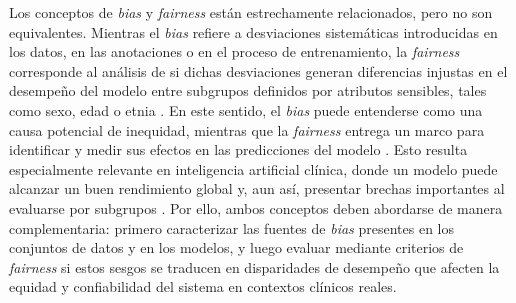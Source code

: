 Los conceptos de \textit{bias} y \textit{fairness} están estrechamente relacionados, pero no son equivalentes. Mientras el \textit{bias} refiere a desviaciones sistemáticas introducidas en los datos, en las anotaciones o en el proceso de entrenamiento, la \textit{fairness} corresponde al análisis de si dichas desviaciones generan diferencias injustas en el desempeño del modelo entre subgrupos definidos por atributos sensibles, tales como sexo, edad o etnia \parencite{williamson2023,sahiner2023}. En este sentido, el \textit{bias} puede entenderse como una causa potencial de inequidad, mientras que la \textit{fairness} entrega un marco para identificar y medir sus efectos en las predicciones del modelo \parencite{liu2023translational,gao2024}. Esto resulta especialmente relevante en inteligencia artificial clínica, donde un modelo puede alcanzar un buen rendimiento global y, aun así, presentar brechas importantes al evaluarse por subgrupos \parencite{NEURIPS2024_c9826b9e,williamson2023}. Por ello, ambos conceptos deben abordarse de manera complementaria: primero caracterizar las fuentes de \textit{bias} presentes en los conjuntos de datos y en los modelos, y luego evaluar mediante criterios de \textit{fairness} si estos sesgos se traducen en disparidades de desempeño que afecten la equidad y confiabilidad del sistema en contextos clínicos reales.
